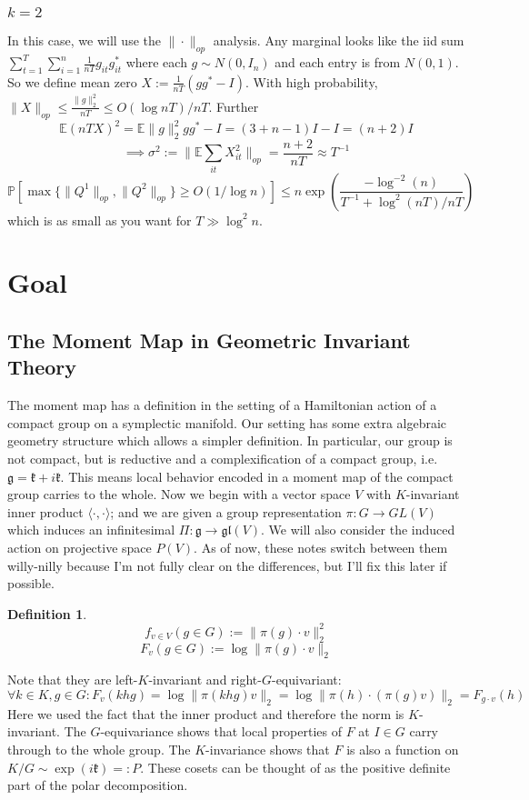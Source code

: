 \documentclass{article}
\newtheorem{definition}{Definition}
\newcommand{\E}{\mathbb{E}}
\renewcommand{\Pr}{\mathbb{P}}
\begin{document}
\subsubsection{$k=2$}
In this case, we will use the $\|\cdot\|_{op}$ analysis. Any marginal looks like the iid sum $\sum_{t=1}^{T} \sum_{i=1}^{n} \frac{1}{nT} g_{it} g_{it}^{*}$ where each $g \sim N(0,I_{n})$ and each entry is from $N(0,1)$. So we define mean zero $X := \frac{1}{nT}(g g^{*} - I)$. With high probability, $\|X\|_{op} \leq \frac{\|g\|_{2}^{2}}{nT} \leq O(\log n T)/nT$. Further
\[ \E (n T X)^{2} = \E \|g\|_{2}^{2} g g^{*} - I = (3 + n-1)I - I = (n+2) I  \]
\[ \implies \sigma^{2} := \|\E \sum_{it} X_{it}^{2}\|_{op} = \frac{n+2}{nT} \approx T^{-1}  \]
\[ \Pr[ \max\{\|Q^{1}\|_{op}, \|Q^{2}\|_{op}\} \geq O(1/\log n) ] \leq n \exp \left( \frac{-\log^{-2}(n)}{T^{-1} + \log^{2}(n T)/nT}  \right) \]
which is as small as you want for $T \gg \log^{2} n$. 




\section{Goal}

\subsection{The Moment Map in Geometric Invariant Theory}

The moment map has a definition in the setting of a Hamiltonian action of a compact group on a symplectic manifold. Our setting has some extra algebraic geometry structure which allows a simpler definition. In particular, our group is not compact, but is reductive and a complexification of a compact group, i.e. $\mathfrak{g} = \mathfrak{k} + i \mathfrak{k}$. This means local behavior encoded in a moment map of the compact group carries to the whole. Now we begin with a vector space $V$ with $K$-invariant inner product $\langle \cdot, \cdot \rangle$; and we are given a group representation $\pi : G \to GL(V)$ which induces an infinitesimal $\Pi : \mathfrak{g} \to \mathfrak{gl}(V)$. We will also consider the induced action on projective space $P(V)$. As of now, these notes switch between them willy-nilly because I'm not fully clear on the differences, but I'll fix this later if possible. 

\begin{definition} 
\[ f_{v \in V}(g \in G) := \|\pi(g) \cdot v\|_{2}^{2} \]
\[ F_{v}(g \in G) := \log \|\pi(g) \cdot v\|_{2}  \]
\end{definition}
Note that they are left-$K$-invariant and right-$G$-equivariant:
\[ \forall k \in K, g \in G: F_{v}(khg) = \log \|\pi(khg) v\|_{2} = \log \|\pi(h) \cdot (\pi(g) v)\|_{2} = F_{g \cdot v}(h)   \]
Here we used the fact that the inner product and therefore the norm is $K$-invariant. The $G$-equivariance shows that local properties of $F$ at $I \in G$ carry through to the whole group. The $K$-invariance shows that $F$ is also a function on $K/G \sim \exp(i \mathfrak{k}) =: P$. These cosets can be thought of as the positive definite part of the polar decomposition. 
\end{document}
